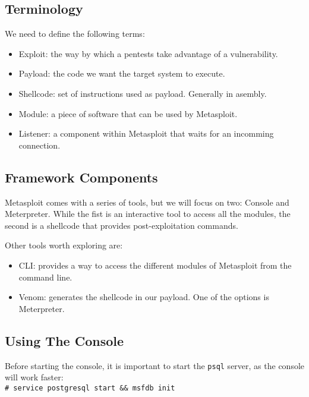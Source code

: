 \documentclass[twocolumn]{article}
\begin{document}
\subsection{Terminology}

\noindent We need to define the following terms:

\begin{itemize}
    \setlength\itemsep{-0.25em}
    \item Exploit: the way by which a pentests take advantage of a vulnerability.
    \item Payload: the code we want the target system to execute.
    \item Shellcode: set of instructions used as payload. Generally in asembly.
    \item Module: a piece of software that can be used by Metasploit.
    \item Listener: a component within Metasploit that waits for an incomming connection.
\end{itemize}

\subsection{Framework Components}
Metasploit comes with a series of tools, but we will focus on two: Console and Meterpreter. While the fist is an interactive tool to access all the modules, the second is a shellcode that provides post-exploitation commands.

\noindent Other tools worth exploring are:

\begin{itemize}
    \setlength\itemsep{-0.25em}
    \item CLI: provides a way to access the different modules of Metasploit from the command line.
    \item Venom: generates the shellcode in our payload. One of the options is Meterpreter.
\end{itemize}

\subsection{Using The Console}
Before starting the console, it is important to start the \texttt{psql} server, as the console will work faster:\\

\indent\texttt{\# service postgresql start \&\& msfdb init}\\
\end{document}
